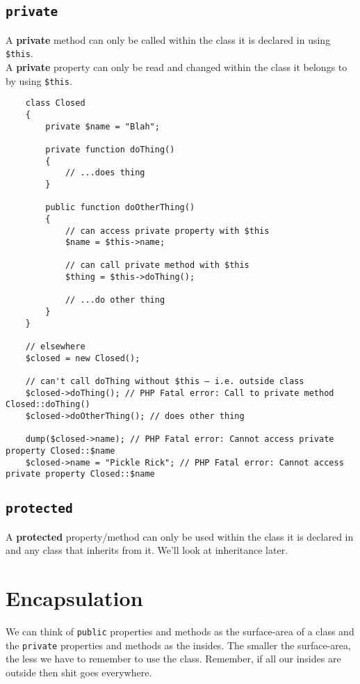 \subsection{\texttt{private}}

A \textbf{private} method can only be called within the class it is declared in using \texttt{\$this}.
\\

A \textbf{private} property can only be read and changed within the class it belongs to by using \texttt{\$this}.

\begin{verbatim}
    class Closed
    {
        private $name = "Blah";

        private function doThing()
        {
            // ...does thing
        }

        public function doOtherThing()
        {
            // can access private property with $this
            $name = $this->name;

            // can call private method with $this
            $thing = $this->doThing();

            // ...do other thing
        }
    }

    // elsewhere
    $closed = new Closed();

    // can't call doThing without $this – i.e. outside class
    $closed->doThing(); // PHP Fatal error: Call to private method Closed::doThing()
    $closed->doOtherThing(); // does other thing

    dump($closed->name); // PHP Fatal error: Cannot access private property Closed::$name
    $closed->name = "Pickle Rick"; // PHP Fatal error: Cannot access private property Closed::$name
\end{verbatim}

\subsection{\texttt{protected}}

A \textbf{protected} property/method can only be used within the class it is declared in and any class that inherits from it. We'll look at inheritance later.


\section{Encapsulation}

We can think of \texttt{public} properties and methods as the surface-area of a class and the \texttt{private} properties and methods as the insides. The smaller the surface-area, the less we have to remember to use the class. Remember, if all our insides are outside then shit goes everywhere.
\\

